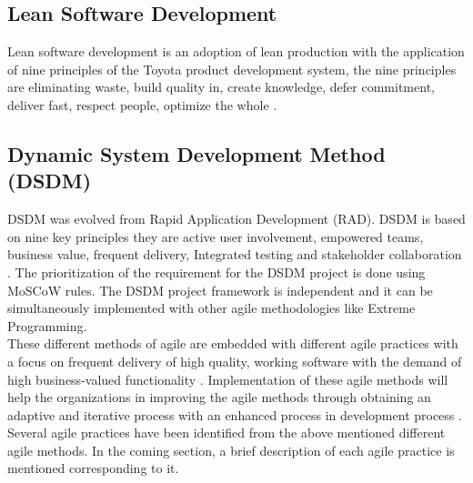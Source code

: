 \documentclass[a4paper,oneside]{bth}
\begin{document}
\subsection{Lean Software Development}
Lean software development is an adoption of lean production with the application of nine principles of the Toyota product development system, the nine principles are eliminating waste, build quality in, create knowledge, defer commitment, deliver fast, respect people, optimize the whole \cite{poppendieck_lean_2007}.
\subsection{Dynamic System Development Method (DSDM)}
DSDM was evolved from Rapid Application Development (RAD). DSDM is based on nine key principles they are active user involvement, empowered teams, business value, frequent delivery, Integrated testing and stakeholder collaboration \cite{dyba_a_empirical_2008}.  The prioritization of the requirement for the DSDM project is done using MoSCoW rules. The DSDM project framework is independent and it can be simultaneously implemented with other agile methodologies like Extreme Programming.\\

These different methods of agile are embedded with different agile practices with a focus on frequent delivery of high quality, working software with the demand of high business-valued functionality \cite{fowler_agile_2001}. Implementation of these agile methods will help the organizations in improving the agile methods through obtaining an adaptive and iterative process with an enhanced process in development process  \cite{larman_agile_2004}. Several agile practices have been identified from the above mentioned different agile methods. In the coming section, a brief description of each agile practice is mentioned corresponding to it.
\end{document}
